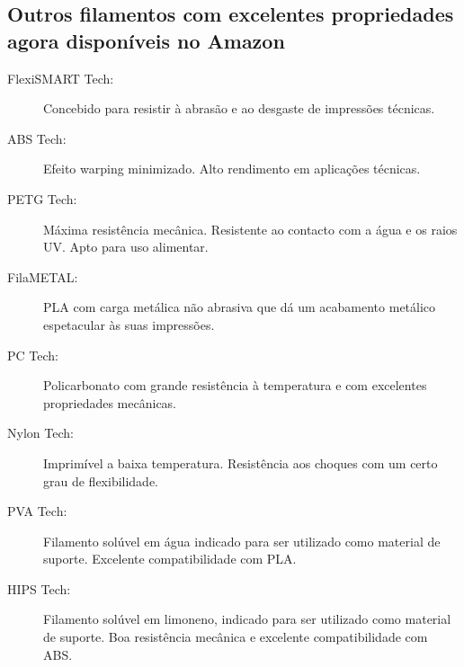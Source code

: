 \documentclass[11pt,a4paper]{article}
\begin{document}
\subsection{Outros filamentos com excelentes propriedades agora disponíveis no Amazon}
\begin{description}
\item[FlexiSMART Tech:] Concebido para resistir à abrasão e ao desgaste de impressões técnicas.
\item[ABS Tech:] Efeito warping minimizado. Alto rendimento em aplicações técnicas.
\item[PETG Tech:] Máxima resistência mecânica. Resistente ao contacto com a água e os raios UV. Apto para uso alimentar.
\item[FilaMETAL:] PLA com carga metálica não abrasiva que dá um acabamento metálico espetacular às suas impressões.
\item[PC Tech:] Policarbonato com grande resistência à temperatura e com excelentes propriedades mecânicas.
\item[Nylon Tech:] Imprimível a baixa temperatura. Resistência aos choques com um certo grau de flexibilidade.
\item[PVA Tech:] Filamento solúvel em água indicado para ser utilizado como material de suporte. Excelente compatibilidade com PLA.
\item[HIPS Tech:] Filamento solúvel em limoneno, indicado para ser utilizado como material de suporte. Boa resistência mecânica e excelente compatibilidade com ABS.
\end{description}

\end{document}
